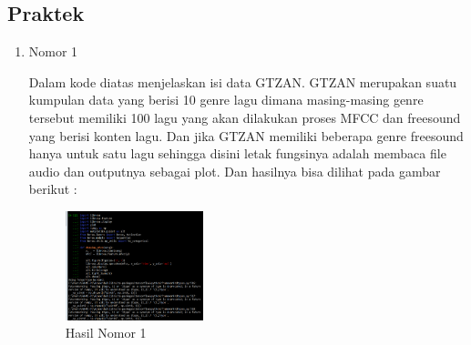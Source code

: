 \subsection{Praktek}
\begin{enumerate}
\item Nomor 1

Dalam kode diatas menjelaskan isi data GTZAN. GTZAN merupakan suatu kumpulan data yang berisi 10 genre lagu dimana masing-masing genre tersebut memiliki 100 lagu yang akan dilakukan proses MFCC dan freesound yang berisi konten lagu. Dan jika GTZAN memiliki beberapa genre freesound hanya untuk satu lagu sehingga disini letak fungsinya adalah membaca file audio dan outputnya sebagai plot. Dan hasilnya bisa dilihat pada gambar berikut :
\hfill\break
	\begin{figure}[H]
		\includegraphics[width=4cm]{figures/1174054/6/10.png}
		\centering
		\caption{Hasil Nomor 1}
	\end{figure}


\end{enumerate}
